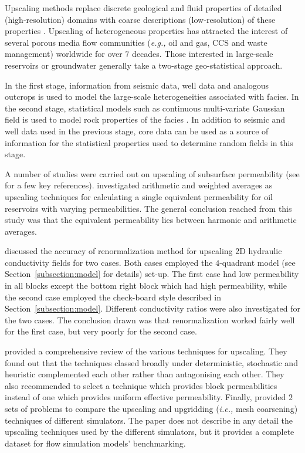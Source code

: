\documentclass[preprint,12pt]{elsarticle}
\newcommand{\eg}{{\it e.g., }}
\newcommand{\ie}{{\it i.e., }}
\begin{document}
Upscaling methods replace discrete geological and fluid properties of detailed (high-resolution) domains with coarse descriptions (low-resolution) of these properties \cite{Vereecken_2007}. Upscaling of heterogeneous properties has attracted the interest of several porous media flow communities (\eg oil and gas, CCS and waste management) worldwide for over $7$ decades. Those interested in large-scale reservoirs or groundwater generally take a two-stage geo-statistical approach. 

In the first stage, information from seismic data, well data and analogous outcrops is used to model the large-scale heterogeneities associated with facies. In the second stage, statistical models such as continuous multi-variate Gaussian field is used to model rock properties of the facies \cite{Ewing_1997}. In addition to seismic and well data used in the previous stage, core data can be used as a source of information for the statistical properties used to determine random fields in this stage.

A number of studies were carried out on upscaling of subsurface permeability (see \cite{Christie_2001SPE10Model, Ewing_1997, Hasting_2001, Indelman_1993, King1996, Vereecken_2007, Wen_1996, Yeo2001} for a few key references). \citet{Cardwell_1945} investigated arithmetic and weighted averages as upscaling techniques for calculating a single equivalent permeability for oil reservoirs with varying permeabilities. The general conclusion reached from this study was that the equivalent permeability lies between harmonic and arithmetic averages.  

\citet{Yeo2001} discussed the accuracy of renormalization method for upscaling 2D hydraulic conductivity fields for two cases. Both cases employed the $4$-quadrant model (see Section~\ref{subsection:model} for details) set-up. The first case had low permeability in all blocks except the bottom right block which had high permeability, while the second case employed the check-board style described in Section~\ref{subsection:model}. Different conductivity ratios were also investigated for the two cases. The conclusion drawn was that renormalization worked fairly well for the first case, but very poorly for the second case.

\citet{Renard_1997} provided a comprehensive review of the various techniques for upscaling. They found out that the techniques classed broadly under deterministic, stochastic and heuristic complemented each other rather than antagonising each other. They also recommended to select a technique which provides block permeabilities instead of one which provides uniform effective permeability. Finally, \citet{Christie_2001SPE10Model} provided $2$ sets of problems to compare the upscaling and upgridding (\ie mesh coarsening) techniques of different simulators. The paper does not describe in any detail the upscaling techniques used by the different simulators, but it provides a complete dataset for flow simulation models' benchmarking.
\end{document}
